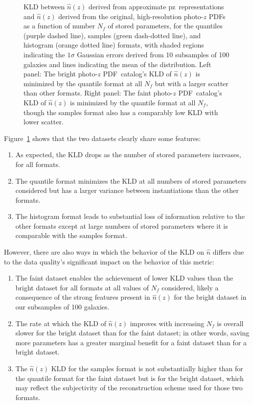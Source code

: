 \documentclass[\docopts]{\docclass}
\newcommand{\pz}{photo-$z$ PDF}
\newcommand{\mgdata}{bright\xspace}
\newcommand{\ssdata}{faint\xspace}
\begin{document}
\begin{figure}
\begin{center}
    \caption{KLD between $\hat{n}(z)$ derived from approximate pz\ 
representations and  $\hat{n}(z)$ derived from the original, high-resolution 
\pz s as a function of number $N_{f}$ of stored parameters, for the quantiles 
(purple dashed line), samples (green dash-dotted line), and histogram (orange 
dotted line) formats, with shaded regions indicating the $1\sigma$ Gaussian 
errors derived from 10 subsamples of 100 galaxies and lines indicating the mean 
of the distribution.
    Left panel: The \mgdata \pz\ catalog's KLD of $\hat{n}(z)$ is minimized by 
the quantile format at all $N_{f}$ but with a larger scatter than other formats.
    Right panel: The \ssdata \pz\ catalog's KLD of $\hat{n}(z)$ is minimized by 
the quantile format at all $N_{f}$, though the samples format also has a 
comparably low KLD with lower scatter.
    \label{fig:kld}}
  \end{center}
\end{figure}
Figure~\ref{fig:kld} shows that the two datasets clearly share some features:
\begin{enumerate}
\item As expected, the KLD drops as the number of stored parameters increases, 
for all formats.
\item The quantile format minimizes the KLD at all numbers of stored parameters 
considered but has a larger variance between instantiations than the other 
formats.
\item The histogram format leads to substantial loss of information relative to 
the other formats except at large numbers of stored parameters where it is 
comparable with the samples format.
\end{enumerate}
However, there are also ways in which the behavior of the KLD on $\hat{n}$ 
differs due to the data quality's significant impact on the behavior of this 
metric:
\begin{enumerate}
\item The \ssdata dataset enables the achievement of lower KLD values than the 
\mgdata dataset for all formats at all values of $N_{f}$ considered, likely a 
consequence of the strong features present in $\hat{n}(z)$ for the \mgdata 
dataset in our subsamples of 100 galaxies.
\item The rate at which the KLD of $\hat{n}(z)$ improves with increasing $N_{f} 
$ is overall slower for the \mgdata dataset than for the \ssdata dataset; in 
other words, saving more parameters has a greater marginal benefit for a 
\ssdata dataset than for a \mgdata dataset.
\item The $\hat{n}(z)$ KLD for the samples format is not substantially higher 
than for the quantile format for the \ssdata dataset but is for the \mgdata 
dataset, which may reflect the subjectivity of the reconstruction scheme used 
for those two formats.
\end{enumerate}
\end{document}

